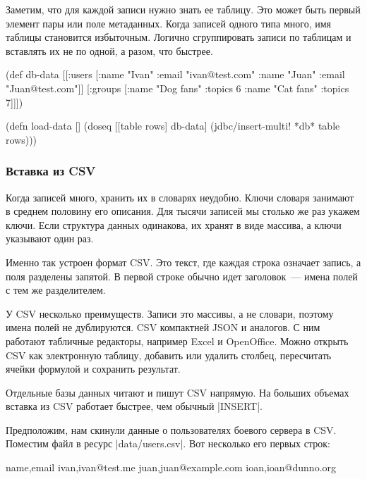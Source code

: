Заметим, что для каждой записи нужно знать ее таблицу. Это может быть первый
элемент пары  или поле метаданных. Когда
записей одного типа много, имя таблицы становится избыточным. Логично
сгруппировать записи по таблицам и вставлять их не по одной, а разом, что
быстрее.

\begin{english}
  \begin{clojure}
(def db-data
  [[:users [{:name "Ivan" :email "ivan@test.com"}
            {:name "Juan" :email "Juan@test.com"}]]
   [:groups [{:name "Dog fans" :topics 6}
             {:name "Cat fans" :topics 7}]]])

(defn load-data []
  (doseq [[table rows] db-data]
    (jdbc/insert-multi! *db* table rows)))
  \end{clojure}
\end{english}

\subsubsection*{Вставка из CSV}

Когда записей много, хранить их в словарях неудобно. Ключи словаря занимают в
среднем половину его описания. Для тысячи записей мы столько же раз укажем
ключи. Если структура данных одинакова, их хранят в виде массива, а ключи
указывают один раз.

Именно так устроен формат
CSV. Это текст,
где каждая строка означает запись, а поля разделены запятой. В первой строке
обычно идет заголовок~--- имена полей с тем же разделителем.

У CSV несколько преимуществ. Записи это массивы, а не словари, поэтому имена
полей не дублируются. CSV компактней JSON и аналогов. С ним работают табличные
редакторы, например Excel и OpenOffice. Можно открыть CSV как электронную
таблицу, добавить или удалить столбец, пересчитать ячейки формулой и сохранить
результат.

Отдельные базы данных читают и пишут CSV напрямую. На больших объемах вставка из
CSV работает быстрее, чем обычный \spverb|INSERT|.

Предположим, нам скинули данные о пользователях боевого сервера в CSV. Поместим
файл в ресурс \spverb|data/users.csv|. Вот несколько его первых строк:

\begin{english}
  \begin{text}
name,email
ivan,ivan@test.me
juan,juan@example.com
ioan,ioan@dunno.org
  \end{text}
\end{english}

